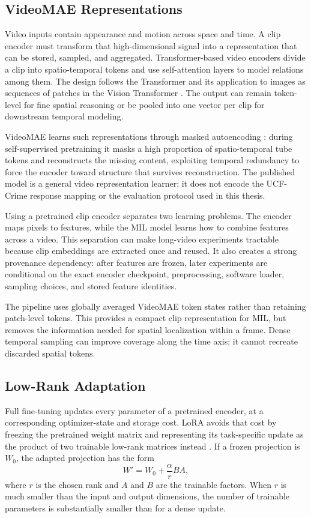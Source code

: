 \subsection{VideoMAE Representations}

Video inputs contain appearance and motion across space and time. A clip encoder
must transform that high-dimensional signal into a representation that can be
stored, sampled, and aggregated. Transformer-based video encoders divide a clip
into spatio-temporal tokens and use self-attention layers to model relations
among them. The design follows the Transformer \cite{vaswani2017attention} and
its application to images as sequences of patches in the Vision Transformer
\cite{dosovitskiy2020image}. The output can remain token-level for fine spatial
reasoning or be pooled into one vector per clip for downstream temporal
modeling.

VideoMAE learns such representations through masked autoencoding
\cite{tong2022videomae}: during self-supervised pretraining it masks a high
proportion of spatio-temporal tube tokens and reconstructs the missing content,
exploiting temporal redundancy to force the encoder toward structure that
survives reconstruction. The published model is a general video representation
learner; it does not encode the UCF-Crime response mapping or the evaluation
protocol used in this thesis.

Using a pretrained clip encoder separates two learning problems. The encoder
maps pixels to features, while the MIL model learns how to combine features
across a video. This separation can make long-video experiments tractable
because clip embeddings are extracted once and reused. It also creates a strong
provenance dependency: after features are frozen, later experiments are
conditional on the exact encoder checkpoint, preprocessing, software loader,
sampling choices, and stored feature identities.

The pipeline uses globally averaged VideoMAE token states rather than retaining
patch-level tokens. This provides a compact clip representation for MIL, but
removes the information needed for spatial localization within a frame. Dense
temporal sampling can improve coverage along the time axis; it cannot recreate
discarded spatial tokens.

\subsection{Low-Rank Adaptation}

Full fine-tuning updates every parameter of a pretrained encoder, at a
corresponding optimizer-state and storage cost. LoRA avoids that cost by
freezing the pretrained weight matrix and representing its task-specific
update as the product of two trainable low-rank matrices instead
\cite{hu2021lora}. If a frozen projection is
$W_0$, the adapted projection has the form
\begin{equation}
    W' = W_0 + \frac{\alpha}{r}BA,
\end{equation}
where $r$ is the chosen rank and $A$ and $B$ are the trainable factors. When
$r$ is much smaller than the input and output dimensions, the number of
trainable parameters is substantially smaller than for a dense update.

